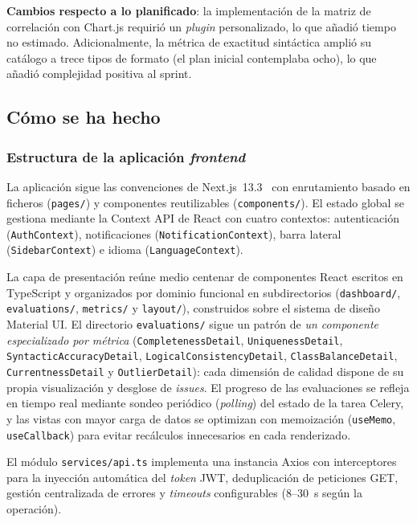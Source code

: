 \textbf{Cambios respecto a lo planificado}: la implementación de la
matriz de correlación con Chart.js requirió un \emph{plugin} personalizado,
lo que añadió tiempo no estimado.  Adicionalmente, la métrica de exactitud
sintáctica amplió su catálogo a trece tipos de formato (el plan inicial
contemplaba ocho), lo que añadió complejidad positiva al sprint.

\subsection{Cómo se ha hecho}

\subsubsection{Estructura de la aplicación \emph{frontend}}
\label{sec:impl-frontend}

La aplicación sigue las convenciones de Next.js~13.3~\citep{nextjs} con
enrutamiento basado en ficheros (\texttt{pages/}) y componentes reutilizables
(\texttt{components/}).  El estado global se gestiona mediante la Context
\ac{API} de React con cuatro contextos: autenticación (\texttt{AuthContext}),
notificaciones (\texttt{NotificationContext}), barra lateral
(\texttt{SidebarContext}) e idioma (\texttt{LanguageContext}).

La capa de presentación reúne medio centenar de componentes React escritos en
TypeScript y organizados por dominio funcional en subdirectorios
(\texttt{dashboard/}, \texttt{evaluations/}, \texttt{metrics/} y
\texttt{layout/}), construidos sobre el sistema de diseño Material UI.  El
directorio \texttt{evaluations/} sigue un patrón de \emph{un componente
especializado por métrica} (\texttt{CompletenessDetail},
\texttt{UniquenessDetail}, \texttt{SyntacticAccuracyDetail},
\texttt{LogicalConsistencyDetail}, \texttt{ClassBalanceDetail},
\texttt{CurrentnessDetail} y \texttt{OutlierDetail}): cada dimensión de calidad
dispone de su propia visualización y desglose de \emph{issues}.  El progreso de
las evaluaciones se refleja en tiempo real mediante sondeo periódico
(\emph{polling}) del estado de la tarea Celery, y las vistas con mayor carga de
datos se optimizan con memoización (\texttt{useMemo}, \texttt{useCallback}) para
evitar recálculos innecesarios en cada renderizado.

El módulo \texttt{services/api.ts} implementa una instancia Axios con
interceptores para la inyección automática del \emph{token} \ac{JWT},
deduplicación de peticiones GET, gestión centralizada de errores y
\emph{timeouts} configurables (8--30~s según la operación).

